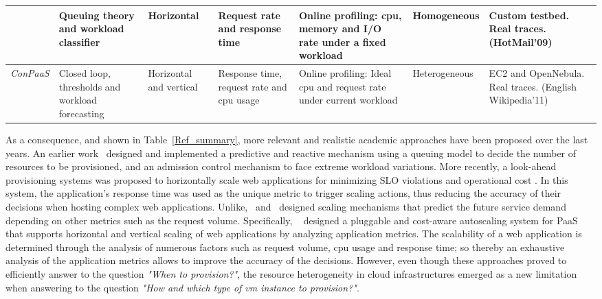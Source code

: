 \begin{table*}
{\begin{tabular}{  | p{0.8cm} | p{3cm} | p{1.5cm} | p{3cm} | p{2.6cm} | p{1.4cm} | p{2.5cm} |}
\textit{\cite{dejavu2012}}   & Queuing theory and workload classifier & Horizontal &  Request rate and response time  & Online profiling: cpu, memory and I/O rate under a fixed workload & Homogeneous &  Custom testbed. \newline Real traces. (HotMail'09)  \\ \hline
\textit{ConPaaS}   & Closed loop, thresholds and workload forecasting & Horizontal and vertical &  Response time, request rate and cpu usage & Online profiling: Ideal cpu and request rate  under current workload & Heterogeneous &  EC2 and OpenNebula. \newline Real traces. (English Wikipedia'11)  \\ \hline
 \end{tabular}

\caption{Summary of references about performance capacity measurement.}
\label{Ref_summary}
}
\end{table*}

As a consequence, and shown in Table~\ref{Ref_summary}, more relevant and realistic academic approaches have been proposed over the last years. An earlier work~\cite{urgaonkar_agile_2008} designed and implemented a predictive and reactive mechanism using a queuing model to decide the number of resources to be provisioned, and an admission control mechanism to face extreme workload variations. More recently, a look-ahead provisioning systems was proposed to horizontally scale web applications for minimizing SLO violations and operational cost \cite{roy_efficient_2011}. In this system, the application's response time was used as the unique metric to trigger scaling actions, thus reducing the accuracy of their decisions when hosting complex web applications. Unlike,~\cite{ali-eldin_2012} and~\cite{bunch_2012} designed scaling mechanisms that predict the future service demand depending on other metrics such as the request volume. Specifically, ~\cite{bunch_2012} designed a pluggable and cost-aware autoscaling system for PaaS that supports horizontal and vertical scaling of web applications by analyzing application metrics. The scalability of a web application is determined through the analysis of numerous factors such as request volume, cpu usage and response time; so thereby an exhaustive analysis of the application metrics allows to improve the accuracy of the decisions. However, even though these approaches proved to efficiently answer to the question \emph{"When to provision?"}, the resource heterogeneity in cloud infrastructures emerged as a new limitation when answering to the question \emph{"How and which type of vm instance to provision?"}.

